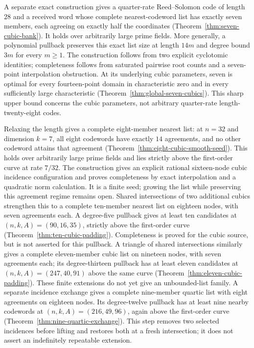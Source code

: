\documentclass[11pt,letterpaper]{article}
\theoremstyle{definition}
\theoremstyle{remark}
\begin{document}
A separate exact construction gives a quarter-rate Reed--Solomon code
of length $28$ and a received word whose complete nearest-codeword list
has exactly seven members, each agreeing on exactly half the coordinates
(Theorem~\ref{thm:seven-cubic-bank}). It holds over arbitrarily large
prime fields. More generally, a polynomial pullback preserves this exact
list size at length $14m$ and degree bound $3m$ for every $m\geq1$.
The construction follows from two explicit cyclotomic identities;
completeness follows from saturated pairwise root counts and a
seven-point interpolation obstruction. At its underlying cubic parameters,
seven is optimal for every fourteen-point domain in characteristic zero
and in every sufficiently large characteristic
(Theorem~\ref{thm:global-seven-cubics}). This sharp upper bound concerns
the cubic parameters, not arbitrary quarter-rate length-twenty-eight codes.

Relaxing the length gives a complete eight-member nearest list: at
$n=32$ and dimension $k=7$, all eight codewords have exactly $14$
agreements, and no other codeword attains that agreement
(Theorem~\ref{thm:eight-cubic-smooth-seed}). This holds over arbitrarily
large prime fields and lies strictly above the first-order curve at
rate $7/32$. The construction gives an explicit rational sixteen-node cubic
incidence configuration and proves completeness by exact interpolation
and a quadratic norm calculation. It is a finite seed; growing the
list while preserving this agreement regime remains open.
Shared intersections of two additional cubics strengthen this to a complete
ten-member nearest list on eighteen nodes, with seven agreements each.
A degree-five pullback gives at least ten candidates at
$(n,k,A)=(90,16,35)$, strictly above the first-order curve
(Theorem~\ref{thm:ten-cubic-padding}). Completeness is proved for the
cubic source, but is not asserted for this pullback.
A triangle of shared intersections similarly gives a complete eleven-member
cubic list on nineteen nodes, with seven agreements each; its degree-thirteen
pullback has at least eleven candidates at $(n,k,A)=(247,40,91)$ above the
same curve (Theorem~\ref{thm:eleven-cubic-padding}). These finite extensions
do not yet give an unbounded-list family.
A separate incidence exchange gives a complete nine-member quartic list
with eight agreements on eighteen nodes. Its degree-twelve pullback
has at least nine nearby codewords at $(n,k,A)=(216,49,96)$, again above
the first-order curve (Theorem~\ref{thm:nine-quartic-exchange}). This step
removes two selected incidences before lifting and restores both at a
fresh intersection; it does not assert an indefinitely repeatable extension.
\end{document}
